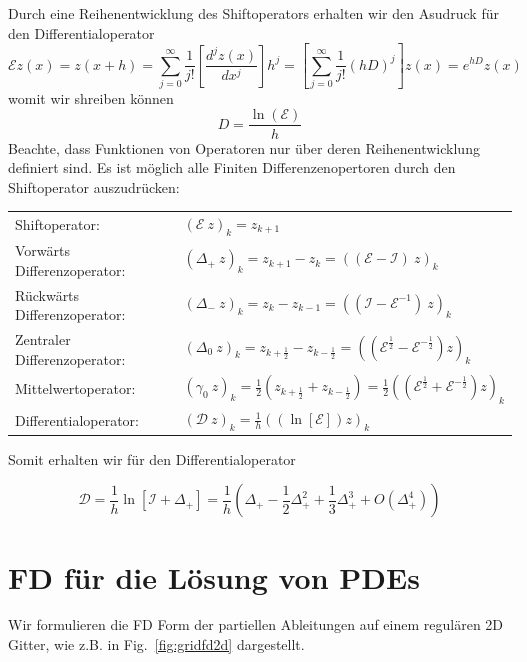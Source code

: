 Durch eine Reihenentwicklung des Shiftoperators erhalten wir den Asudruck
für den Differentialoperator
\[
\mathcal{E}z(x)=z(x+h)=\sum_{j=0}^\infty \frac{1}{j!}
\left[{\frac{d^jz(x)}{dx^j}}\right]h^j=
\left[{\sum_{j=0}^\infty}\frac{1}{j!}(hD)^j\right]z(x)=e^{hD}z(x)
\]
womit wir shreiben können
\[ D=\frac{\ln(\mathcal{E})}{h}\]
Beachte, dass Funktionen von Operatoren nur über deren Reihenentwicklung
definiert sind.  Es ist möglich alle Finiten Differenzenopertoren durch den
Shiftoperator auszudrücken:

\begin{tabular}{ll}
	Shiftoperator:&   $(\mathcal{E}\ z)_k=z_{k+1} $\\
	Vorwärts Differenzoperator:&       $(\Delta_+\
	z)_k=z_{k+1}-z_{k}=\left( (\mathcal{E}-\mathcal{I})\ z \right)_k$\\
	Rückwärts Differenzoperator:&     $(\Delta_-\ z)_k=z_{k}-z_{k-1}=
	\left( (\mathcal{I}-\mathcal{E}^{-1})\ z \right)_k$\\
	Zentraler Differenzoperator:&       $(\Delta_0\
	z)_k=z_{k+\frac{1}{2}}-z_{k-\frac{1}{2}}=\left(
	(\mathcal{E}^\frac{1}{2}-\mathcal{E}^{-\frac{1}{2}})z \right)_k$\\
	Mittelwertoperator:&        $(\gamma_0\
	z)_k=\frac{1}{2}(z_{k+\frac{1}{2}}+z_{k-\frac{1}{2}})
	=\frac{1}{2}\left(
	(\mathcal{E}^\frac{1}{2}+\mathcal{E}^{-\frac{1}{2}})z \right)_k$\\
	Differentialoperator:&    $(\mathcal{D}\ z)_k=\frac{1}{h}\left(
	(\ln[\mathcal{E}])z \right)_k$ 
\end{tabular}

Somit erhalten wir für den Differentialoperator

\[
\mathcal{D}=\frac{1}{h}\ln[\mathcal{I}+\Delta_+]=
\frac{1}{h}\left({\Delta_+-\frac{1}{2}\Delta_+^2+
\frac{1}{3}\Delta_+^3 +O\left(\Delta_+^4\right)}\right)
\]
\section{FD für die Lösung von PDEs}
Wir formulieren die FD Form der partiellen Ableitungen auf einem regulären 2D
Gitter, wie z.B. in Fig.\ \ref{fig:gridfd2d} dargestellt.

